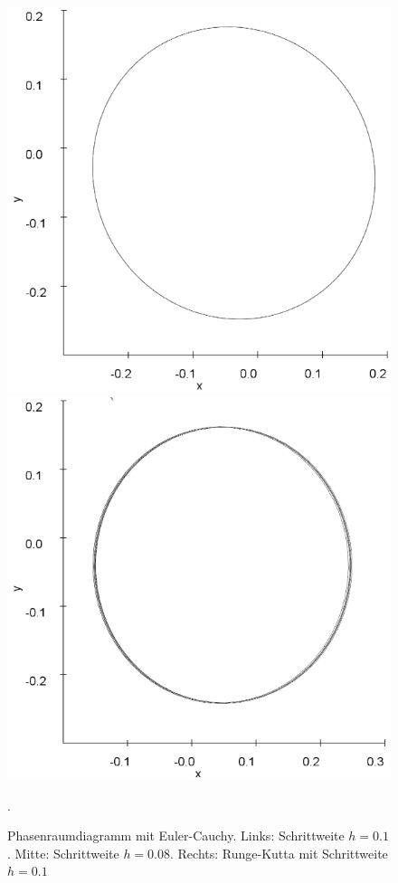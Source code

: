 \documentclass{scrartcl}
\begin{document}
\begin{figure}[!htbp]
\includegraphics[scale=0.28]{duffing-awp1-500k-nach-500k-h0,08-euler}
\includegraphics[scale=0.28]{duffing-awp1-500k-nach-500k-h0,1-runge}
\caption{Phasenraumdiagramm mit Euler-Cauchy. Links: Schrittweite $h=0.1$. Mitte: Schrittweite $h=0.08$. Rechts: Runge-Kutta mit Schrittweite $h=0.1$}. 
\label{fig:duffing-awp1}
\end{figure}
\end{document}
